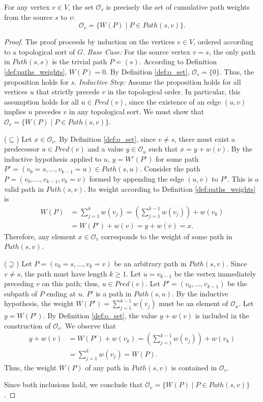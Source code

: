 \begin{proposition}
    \label{prop:o_set_correctness}
    For any vertex $v \in V$, the set $\mathcal{O}_v$ is precisely the set of cumulative path weights from the source $s$ to $v$:
    \[ \mathcal{O}_v = \{ W(P) \mid P \in Path(s, v) \}. \]
\end{proposition}
\begin{proof}
    The proof proceeds by induction on the vertices $v \in V$, ordered according to a topological sort of $G$.
    \textit{Base Case:} For the source vertex $v=s$, the only path in $Path(s, s)$ is the trivial path $P=(s)$. According to Definition \ref{def:paths_weights}, $W(P)=0$. By Definition \ref{def:o_set}, $\mathcal{O}_s = \{0\}$. Thus, the proposition holds for $s$.
    \textit{Inductive Step:} Assume the proposition holds for all vertices $u$ that strictly precede $v$ in the topological order. In particular, this assumption holds for all $u \in Pred(v)$, since the existence of an edge $(u, v)$ implies $u$ precedes $v$ in any topological sort. We must show that $\mathcal{O}_v = \{ W(P) \mid P \in Path(s, v) \}$.

    ($\subseteq$) Let $x \in \mathcal{O}_v$. By Definition \ref{def:o_set}, since $v \neq s$, there must exist a predecessor $u \in Pred(v)$ and a value $y \in \mathcal{O}_u$ such that $x = y + w(v)$. By the inductive hypothesis applied to $u$, $y = W'(P')$ for some path $P' = (v_0=s, \dots, v_{k-1}=u) \in Path(s, u)$. Consider the path $P = (v_0, \dots, v_{k-1}, v_k=v)$ formed by appending the edge $(u, v)$ to $P'$. This is a valid path in $Path(s, v)$. Its weight according to Definition \ref{def:paths_weights} is
    \begin{align*}
        W(P) & = \sum_{j=1}^{k} w(v_j) = \left(\sum_{j=1}^{k-1} w(v_j)\right) + w(v_k) \\
             & = W(P') + w(v) = y + w(v) = x.
    \end{align*}
    Therefore, any element $x \in \mathcal{O}_v$ corresponds to the weight of some path in $Path(s, v)$.

    ($\supseteq$) Let $P = (v_0=s, \dots, v_k=v)$ be an arbitrary path in $Path(s, v)$. Since $v \neq s$, the path must have length $k \ge 1$. Let $u = v_{k-1}$ be the vertex immediately preceding $v$ on this path; thus, $u \in Pred(v)$. Let $P' = (v_0, \dots, v_{k-1})$ be the subpath of $P$ ending at $u$. $P'$ is a path in $Path(s, u)$. By the inductive hypothesis, the weight $W(P') = \sum_{j=1}^{k-1} w(v_j)$ must be an element of $\mathcal{O}_u$. Let $y = W(P')$. By Definition \ref{def:o_set}, the value $y + w(v)$ is included in the construction of $\mathcal{O}_v$. We observe that
    \begin{align*}
        y + w(v) & = W(P') + w(v_k) = \left(\sum_{j=1}^{k-1} w(v_j)\right) + w(v_k) \\
                 & = \sum_{j=1}^{k} w(v_j) = W(P).
    \end{align*}
    Thus, the weight $W(P)$ of any path in $Path(s, v)$ is contained in $\mathcal{O}_v$.

    Since both inclusions hold, we conclude that $\mathcal{O}_v = \{ W(P) \mid P \in Path(s, v) \}$.
\end{proof}

